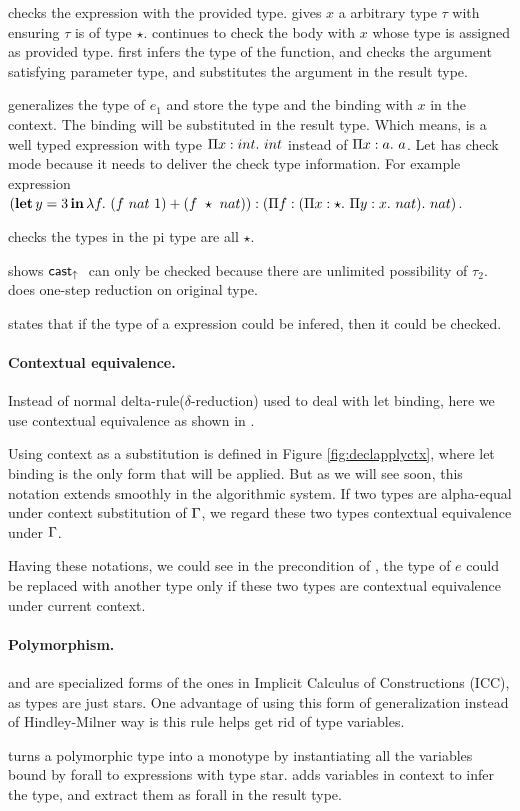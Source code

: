  checks the expression with the provided type.  gives $x$ a arbitrary type $\tau$ with ensuring $\tau$ is of type $\star$.  continues to check the body with $x$ whose type is assigned as provided type.  first infers the type of the function, and checks the argument satisfying parameter type, and substitutes the argument in the result type.

 generalizes the type of $e_1$ and store the type and the binding with $x$ in the context. The binding will be substituted in the result type. Which means,  is a well typed expression with type $\Pi x:int.~ {int}$ instead of $\Pi x:a.~ a $. Let has check mode because it needs to deliver the check type information. For example expression $(\operatorname{\mathbf{let}} y = 3 \operatorname{\mathbf{in}} \lambda {f}.~ {(f~nat~1) + (f~\star~nat))}: (\Pi f:(\Pi x:\star.~ {\Pi y:x.~ nat}).~ nat)$.

 checks the types in the pi type are all $\star$.

 shows $\mathsf{cast}_\uparrow~$ can only be checked because there are unlimited possibility of $\tau_2$.  does one-step reduction on original type.

 states that if the type of a expression could be infered, then it could be checked.

\paragraph{Contextual equivalence.} Instead of normal delta-rule($\delta$-reduction) used to deal with let binding, here we use contextual equivalence as shown in .

Using context as a substitution is defined in Figure \ref{fig:declapplyctx}, where let binding is the only form that will be applied. But as we will see soon, this notation extends smoothly in the algorithmic system. If two types are alpha-equal under context substitution of $\Gamma$, we regard these two types contextual equivalence under $\Gamma$.

Having these notations, we could see in the precondition of , the type of $e$ could be replaced with another type only if these two types are contextual equivalence under current context.

\paragraph{Polymorphism.}  and  are specialized forms of the ones in Implicit Calculus of Constructions (ICC), as types are just stars. One advantage of using this form of generalization instead of Hindley-Milner way is this rule helps get rid of type variables.

 turns a polymorphic type into a monotype by instantiating all the variables bound by forall to expressions with type star.  adds variables in context to infer the type, and extract them as forall in the result type.
